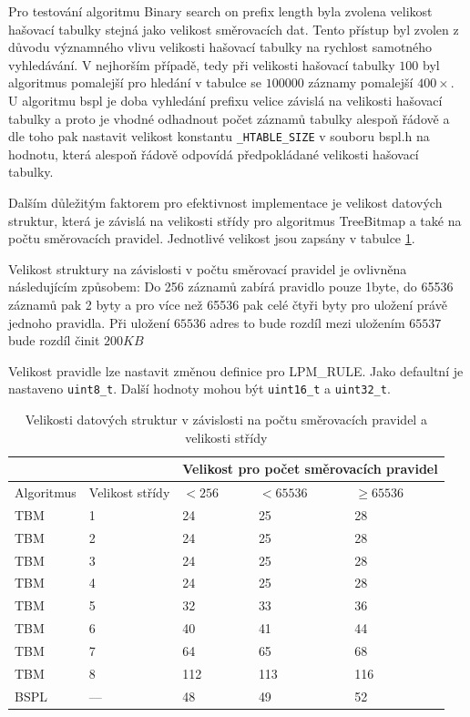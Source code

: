 Pro testování algoritmu Binary search on prefix length byla zvolena velikost hašovací tabulky
stejná jako velikost směrovacích dat. Tento přístup byl zvolen z důvodu významného vlivu
velikosti hašovací tabulky na rychlost samotného vyhledávání. V nejhorším případě, tedy při
velikosti hašovací tabulky $100$ byl algoritmus pomalejší pro hledání v tabulce se $100 000$ záznamy pomalejší
$400\times$.
U algoritmu bspl je doba vyhledání prefixu velice závislá na velikosti hašovací tabulky a proto je vhodné odhadnout počet záznamů tabulky alespoň řádově a dle toho pak nastavit velikost konstantu {\tt \_HTABLE\_SIZE} v souboru bspl.h na hodnotu, která alespoň řádově odpovídá předpokládané velikosti hašovací tabulky.

Dalším důležitým faktorem pro efektivnost implementace je velikost datových struktur, která je
závislá na velikosti střídy pro algoritmus TreeBitmap a také na počtu směrovacích pravidel.
Jednotlivé velikost jsou zapsány v tabulce \ref{tab:lpm-input}.

Velikost struktury na závislosti v počtu směrovací pravidel je ovlivněna následujícím způsobem:
Do 256 záznamů zabírá pravidlo pouze 1byte, do 65536 záznamů pak 2 byty a pro více než 65536 pak celé čtyři byty pro uložení právě jednoho pravidla. Při uložení $65536$ adres to bude rozdíl mezi uložením $65537$ bude rozdíl činit
$200KB$

Velikost pravidle lze nastavit změnou definice pro LPM\_RULE.
Jako defaultní je nastaveno \texttt{uint8\_t}. Další hodnoty mohou být \texttt{uint16\_t} a \texttt{uint32\_t}.

\begin{table}[!htbp]
	\center
    \begin{tabular}{|l|l|l|l|l|}
    \hline
    & & \multicolumn{3}{l|}{Velikost pro počet směrovacích pravidel} \\ \hline
    Algoritmus & Velikost střídy & $< 256$ & $< 65536$ & $\geq 65536$\\ \hhline{|=|=|=|=|=|}
    TBM & 1 & 24 & 25 & 28 \\ \hline
    TBM & 2 & 24 & 25 & 28\\ \hline
    TBM & 3 & 24 & 25 & 28\\ \hline
    TBM & 4 & 24 & 25 & 28\\ \hline
    TBM & 5 & 32 & 33 & 36\\ \hline
    TBM & 6 & 40 & 41 & 44\\ \hline
    TBM & 7 & 64 & 65 & 68\\ \hline
    TBM & 8 & 112 & 113 & 116\\ \hline
    BSPL & --- & 48 & 49 & 52\\ \hline
    \end{tabular}
	\caption{Velikosti datových struktur v závislosti na počtu směrovacích pravidel a velikosti střídy}
    \label{tab:lpm-input}
\end{table}


